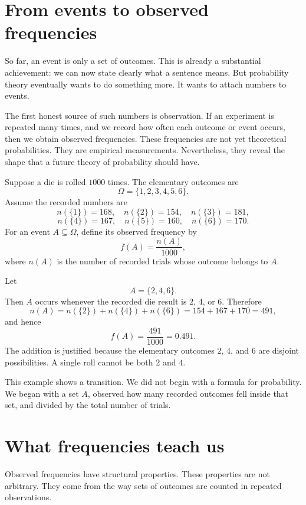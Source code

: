 \section{From events to observed frequencies}

So far, an event is only a set of outcomes. This is already a substantial achievement: we can now state clearly what a sentence means. But probability theory eventually wants to do something more. It wants to attach numbers to events.

The first honest source of such numbers is observation. If an experiment is repeated many times, and we record how often each outcome or event occurs, then we obtain observed frequencies. These frequencies are not yet theoretical probabilities. They are empirical measurements. Nevertheless, they reveal the shape that a future theory of probability should have.

Suppose a die is rolled \(1000\) times. The elementary outcomes are
\[
\Omega=\{1,2,3,4,5,6\}.
\]
Assume the recorded numbers are
\[
n(\{1\})=168,\quad n(\{2\})=154,\quad n(\{3\})=181,
\]
\[
n(\{4\})=167,\quad n(\{5\})=160,\quad n(\{6\})=170.
\]
For an event \(A\subseteq\Omega\), define its observed frequency by
\[
f(A)=\frac{n(A)}{1000},
\]
where \(n(A)\) is the number of recorded trials whose outcome belongs to \(A\).

\begin{examplebox}
Let
\[
A=\{2,4,6\}.
\]
Then \(A\) occurs whenever the recorded die result is \(2\), \(4\), or \(6\). Therefore
\[
n(A)=n(\{2\})+n(\{4\})+n(\{6\})=154+167+170=491,
\]
and hence
\[
f(A)=\frac{491}{1000}=0.491.
\]
The addition is justified because the elementary outcomes \(2\), \(4\), and \(6\) are disjoint possibilities. A single roll cannot be both \(2\) and \(4\).
\end{examplebox}

This example shows a transition. We did not begin with a formula for probability. We began with a set \(A\), observed how many recorded outcomes fell inside that set, and divided by the total number of trials.

\section{What frequencies teach us}

Observed frequencies have structural properties. These properties are not arbitrary. They come from the way sets of outcomes are counted in repeated observations.

